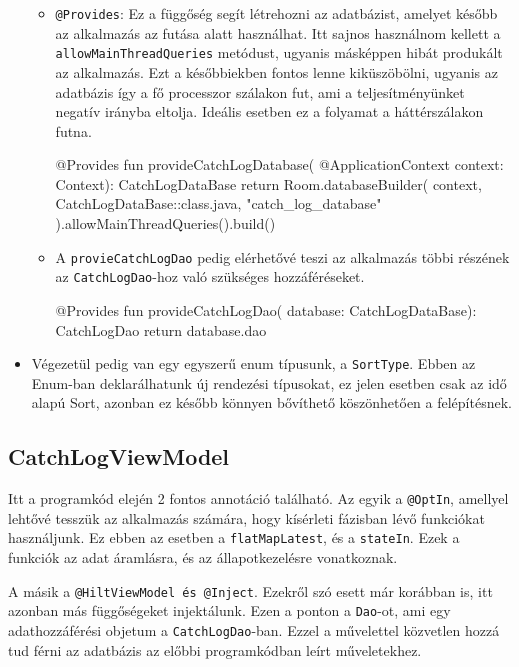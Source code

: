 \begin{itemize}
\begin{itemize}
        \item \texttt{@Provides}: Ez a függőség segít létrehozni az adatbázist, amelyet később az alkalmazás az futása alatt használhat. Itt sajnos használnom kellett a \texttt{allowMainThreadQueries} metódust, ugyanis másképpen hibát produkált az alkalmazás. Ezt a későbbiekben fontos lenne kiküszöbölni, ugyanis az adatbázis így a fő processzor szálakon fut, ami a teljesítményünket negatív irányba eltolja. Ideális esetben ez a folyamat a háttérszálakon futna.
\begin{java}[caption = {provideCatchLogDataBase függőség.}]
@Provides
fun provideCatchLogDatabase(
@ApplicationContext context: Context):
CatchLogDataBase {
    return Room.databaseBuilder(
        context,
        CatchLogDataBase::class.java,
        "catch_log_database"
    ).allowMainThreadQueries().build()
}
\end{java}
        \item A \texttt{provieCatchLogDao} pedig elérhetővé teszi az alkalmazás többi részének az \texttt{CatchLogDao}-hoz való szükséges hozzáféréseket.
\begin{java}
@Provides
    fun provideCatchLogDao(
    database: CatchLogDataBase): CatchLogDao {
        return database.dao
    }
\end{java}
    \end{itemize}
    \item Végezetül pedig van egy egyszerű enum típusunk, a \texttt{SortType}. Ebben az Enum-ban deklarálhatunk új rendezési típusokat, ez jelen esetben csak az idő alapú Sort, azonban ez később könnyen bővíthető köszönhetően a felépítésnek.
\end{itemize}

\subsection{CatchLogViewModel}

Itt a programkód elején 2 fontos annotáció található. Az egyik a \texttt{@OptIn}, amellyel lehtővé tesszük az alkalmazás számára, hogy kísérleti fázisban lévő funkciókat használjunk. Ez ebben az esetben a \texttt{flatMapLatest}, és a \texttt{stateIn}. Ezek a funkciók az adat áramlásra, és az állapotkezelésre vonatkoznak.

A másik a \texttt{@HiltViewModel és @Inject}. Ezekről szó esett már korábban is, itt azonban más függőségeket injektálunk. Ezen a ponton a \texttt{Dao}-ot, ami egy adathozzáférési objetum a \texttt{CatchLogDao}-ban. Ezzel a művelettel közvetlen hozzá tud férni az adatbázis az előbbi programkódban leírt műveletekhez.

